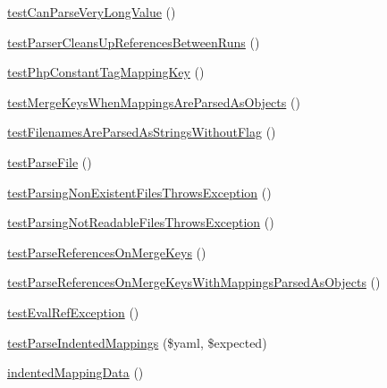 \begin{DoxyCompactItemize}
\item 
\mbox{\hyperlink{class_symfony_1_1_component_1_1_yaml_1_1_tests_1_1_parser_test_a331e1d279a8bbdf05d649e445ed1ebc7}{test\+Can\+Parse\+Very\+Long\+Value}} ()
\item 
\mbox{\hyperlink{class_symfony_1_1_component_1_1_yaml_1_1_tests_1_1_parser_test_a43f5b60c849f681973de8acfdf2bd99f}{test\+Parser\+Cleans\+Up\+References\+Between\+Runs}} ()
\item 
\mbox{\hyperlink{class_symfony_1_1_component_1_1_yaml_1_1_tests_1_1_parser_test_a333a9e9d61fb7cb9894e421f42d06f6f}{test\+Php\+Constant\+Tag\+Mapping\+Key}} ()
\item 
\mbox{\hyperlink{class_symfony_1_1_component_1_1_yaml_1_1_tests_1_1_parser_test_a50f97ba34d9a7b1e2c41a081e8dca42d}{test\+Merge\+Keys\+When\+Mappings\+Are\+Parsed\+As\+Objects}} ()
\item 
\mbox{\hyperlink{class_symfony_1_1_component_1_1_yaml_1_1_tests_1_1_parser_test_ab4c5fe235713bd9554ede024d54cf111}{test\+Filenames\+Are\+Parsed\+As\+Strings\+Without\+Flag}} ()
\item 
\mbox{\hyperlink{class_symfony_1_1_component_1_1_yaml_1_1_tests_1_1_parser_test_a4274fe48c53c25465d4ce4579a836d07}{test\+Parse\+File}} ()
\item 
\mbox{\hyperlink{class_symfony_1_1_component_1_1_yaml_1_1_tests_1_1_parser_test_a110f657fbb93e84c2a7ca83b33f0a4d2}{test\+Parsing\+Non\+Existent\+Files\+Throws\+Exception}} ()
\item 
\mbox{\hyperlink{class_symfony_1_1_component_1_1_yaml_1_1_tests_1_1_parser_test_a024583b7122097f586a4be3fb35523fd}{test\+Parsing\+Not\+Readable\+Files\+Throws\+Exception}} ()
\item 
\mbox{\hyperlink{class_symfony_1_1_component_1_1_yaml_1_1_tests_1_1_parser_test_a8081e99ad3d9771d8a5bdbc00da23ffc}{test\+Parse\+References\+On\+Merge\+Keys}} ()
\item 
\mbox{\hyperlink{class_symfony_1_1_component_1_1_yaml_1_1_tests_1_1_parser_test_a911080631f6c65a21516cc10edabb473}{test\+Parse\+References\+On\+Merge\+Keys\+With\+Mappings\+Parsed\+As\+Objects}} ()
\item 
\mbox{\hyperlink{class_symfony_1_1_component_1_1_yaml_1_1_tests_1_1_parser_test_a0e05ff2c29b7c5036791af55ac27a7aa}{test\+Eval\+Ref\+Exception}} ()
\item 
\mbox{\hyperlink{class_symfony_1_1_component_1_1_yaml_1_1_tests_1_1_parser_test_a6478bc0a85c00492292b386da02fab25}{test\+Parse\+Indented\+Mappings}} (\$yaml, \$expected)
\item 
\mbox{\hyperlink{class_symfony_1_1_component_1_1_yaml_1_1_tests_1_1_parser_test_a8fe20d9835c9f7ca349573a4d002a38e}{indented\+Mapping\+Data}} ()
\end{DoxyCompactItemize}
